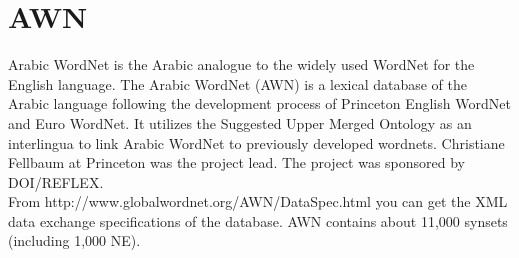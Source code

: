 \section{AWN}\label{awn}
Arabic WordNet is the Arabic analogue to the widely used WordNet for the English language. The Arabic WordNet (AWN) is a lexical database of the Arabic language following the development process of Princeton English WordNet and Euro WordNet. It utilizes the Suggested Upper Merged Ontology as an interlingua to link Arabic WordNet to previously developed wordnets. Christiane Fellbaum at Princeton was the project lead. The project was sponsored by DOI/REFLEX.\\
From http://www.globalwordnet.org/AWN/DataSpec.html you can get the XML data exchange specifications of the database. AWN contains about 11,000 synsets (including 1,000 NE).\\

